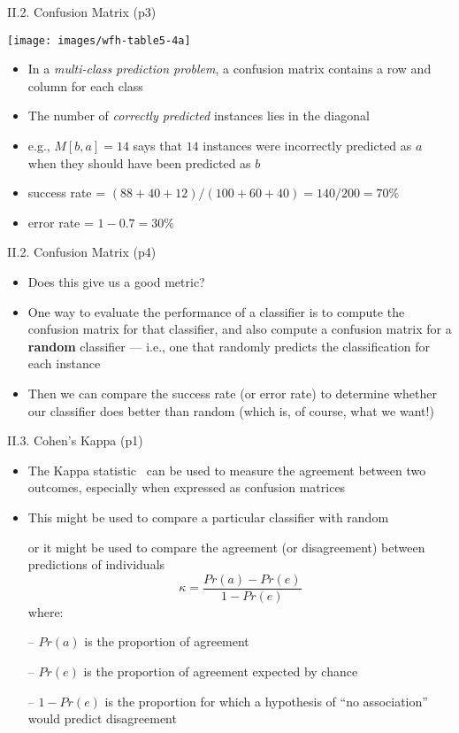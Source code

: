 \documentclass[handout]{beamer}
\newcommand{\strong}[1]{\textbf{\color{teal} #1}}
\begin{document}
\begin{frame}{II.2. Confusion Matrix (p3)}
\begin{center}
\texttt{[image: images/wfh-table5-4a]}\\
\cite[Table 5.4a]{WFH3:2011}
\end{center}
\begin{itemize}
\item In a \emph{multi-class prediction problem}, a confusion matrix contains a row and column for each class
\item The number of \emph{correctly predicted} instances lies in the diagonal
\item e.g., $M[b,a]=14$ says that $14$ instances were incorrectly predicted as $a$ when they should have been predicted as $b$
\item success rate = $(88 + 40 + 12) / (100 + 60 + 40) = 140/200 = 70\%$
\item error rate = $1 - 0.7 = 30\%$ 
\end{itemize}
\end{frame}
\begin{frame}{II.2. Confusion Matrix (p4)}
\begin{itemize}
\item Does this give us a good metric?
\item One way to evaluate the performance of a classifier is to compute the confusion matrix for that classifier, and also compute a confusion matrix for a \strong{random} classifier --- i.e., one that randomly predicts the classification for each instance
\item Then we can compare the success rate (or error rate) to determine whether our classifier does better than random (which is, of course, what we want!)
\end{itemize}
\end{frame}
\begin{frame}{II.3. Cohen's Kappa (p1)}
\begin{itemize}
\item The Kappa statistic~\cite{cohen:1960} can be used to measure the agreement between two outcomes, especially when expressed as confusion matrices
\item This might be used to compare a particular classifier with random
\item[] or it might be used to compare the agreement (or disagreement) between predictions of individuals
\[
\kappa = \frac{ Pr(a) - Pr(e) }{ 1 - Pr(e) }
\]
where:
\item[--] $Pr(a)$ is the proportion of agreement
\item[--] $Pr(e)$ is the proportion of agreement expected by chance
\item[--] $1-Pr(e)$ is the proportion for which a hypothesis of ``no association'' would predict disagreement
\end{itemize}
\end{frame}
\end{document}
